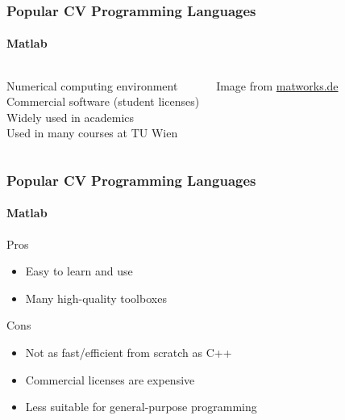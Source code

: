 \documentclass[xetex,professionalfont]{beamer}
\begin{document}
\begin{frame}
\frametitle{Popular CV Programming Languages}
\framesubtitle{Matlab}

\begin{columns}

Numerical computing environment \\
Commercial software (student licenses)\\
Widely used in academics \\
Used in many courses at TU Wien


\begin{center}
{
	{\centering Image from \url{matworks.de}}}
\end{center}

\end{columns}

\end{frame}


\begin{frame}
\frametitle{Popular CV Programming Languages}
\framesubtitle{Matlab}

Pros
\begin{itemize}
	\item Easy to learn and use
	\item Many high-quality toolboxes
\end{itemize}

\medskip
Cons
\begin{itemize}
	\item Not as fast/efficient from scratch as C++ %
	\item Commercial licenses are expensive
	\item Less suitable for general-purpose programming
\end{itemize}

\end{frame}

\end{document}
